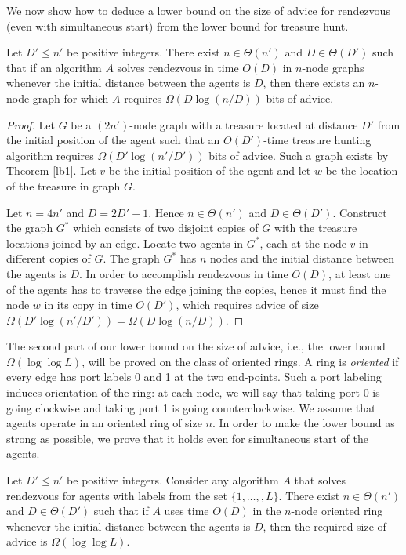 \documentclass{llncs}
\begin{document}
We now show how to deduce a lower bound on the size of advice for rendezvous (even with simultaneous start) from the lower bound for treasure hunt.

\begin{corollary}\label{cor}
Let $D' \leq n'$ be positive integers. 
There exist $n \in \Theta(n')$ and $D \in \Theta(D')$ such that 
if an algorithm $A$ solves rendezvous in time $O(D)$ in $n$-node graphs
whenever the initial distance between the agents is $D$, then there exists an $n$-node graph for which $A$ requires
$\Omega(D\log(n/D))$ bits of advice.
\end{corollary}

\begin{proof}
Let $G$ be a $(2n')$-node graph with a treasure located at distance $D'$ from the initial position of the agent
such that an $O(D')$-time treasure hunting algorithm requires $\Omega(D'\log(n'/D'))$ bits of advice. Such a graph exists by
Theorem \ref{lb1}. Let $v$ be the initial position of the agent and let $w$ be the location of the treasure in graph $G$. 

Let $n=4n'$ and $D=2D'+1$. Hence $n \in \Theta(n')$ and $D \in \Theta(D')$.
Construct the graph $G^*$ which consists of two disjoint copies of $G$ with the treasure locations joined by an edge. Locate two agents in $G^*$, each at the node $v$ in different copies of $G$.
The graph $G^*$ has $n$ nodes and the initial distance between the agents is $D$. In order to accomplish rendezvous in time $O(D)$, at least one of the agents has to
traverse the edge joining the copies, hence it must find the node $w$ in its copy in time $O(D')$,  which requires advice of size $\Omega(D'\log(n'/D'))=\Omega(D\log(n/D))$.
\end{proof}



The second part of our lower bound on the size of advice, i.e., the lower bound $\Omega(\log\log L)$, will be proved on the class of oriented rings.
A ring is {\em oriented} if every edge has port labels 0 and 1 at the two end-points.
Such a port labeling induces orientation of the ring: at each node, we will say that taking port 0 is going clockwise and taking port 1 is going counterclockwise.
We assume that agents operate in an oriented ring of size $n$. In order to make the lower bound as strong as possible, we prove that it holds even for simultaneous start of the agents. 

\begin{theorem}\label{lb2}
Let $D' \leq n'$ be positive integers. Consider any algorithm $A$ that solves rendezvous for agents with labels from the set $\{1,\dots, ,L\}$. 
There exist $n \in \Theta(n')$ and $D \in \Theta(D')$ such that if $A$ uses time  $O(D)$ in the $n$-node oriented ring whenever the initial distance between the agents is $D$, then the required size of advice is
$\Omega(\log\log L)$.
\end{theorem}
\end{document}
